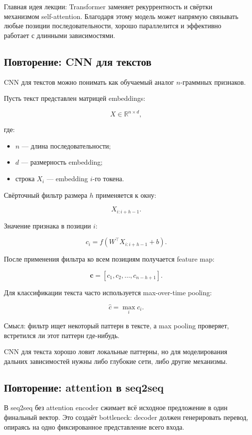 \documentclass[a4paper,12pt]{article}
\begin{document}
Главная идея лекции: Transformer заменяет рекуррентность и свёртки механизмом self-attention. Благодаря этому модель может напрямую связывать любые позиции последовательности, хорошо параллелится и эффективно работает с длинными зависимостями.

\subsection{Повторение: CNN для текстов}

CNN для текстов можно понимать как обучаемый аналог \(n\)-граммных признаков.

Пусть текст представлен матрицей embeddings:

\[
X \in \mathbb{R}^{n \times d},
\]

где:

\begin{itemize}
    \item \(n\) --- длина последовательности;
    \item \(d\) --- размерность embedding;
    \item строка \(X_i\) --- embedding \(i\)-го токена.
\end{itemize}

Свёрточный фильтр размера \(h\) применяется к окну:

\[
X_{i:i+h-1}.
\]

Значение признака в позиции \(i\):

\[
c_i = f(W^\top X_{i:i+h-1} + b).
\]

После применения фильтра ко всем позициям получается feature map:

\[
\bm{c}
=
[c_1, c_2, \dots, c_{n-h+1}].
\]

Для классификации текста часто используется max-over-time pooling:

\[
\hat{c} = \max_i c_i.
\]

Смысл: фильтр ищет некоторый паттерн в тексте, а max pooling проверяет, встретился ли этот паттерн где-нибудь.

CNN для текста хорошо ловит локальные паттерны, но для моделирования дальних зависимостей нужны либо глубокие сети, либо другие механизмы.

\subsection{Повторение: attention в seq2seq}

В seq2seq без attention encoder сжимает всё исходное предложение в один финальный вектор. Это создаёт bottleneck: decoder должен генерировать перевод, опираясь на одно фиксированное представление всего входа.
\end{document}
